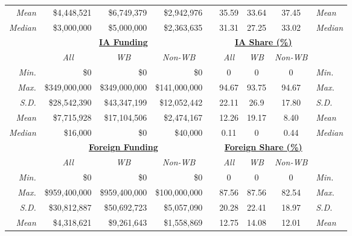 \documentclass{article}
\begin{document}
\begin{singlespace}
\begin{table}[H]
{\begin{tabular}{rrrrlcccl}
			\textit{Mean} & \$4,448,521 & \$6,749,379 & \$2,942,976 &  & 35.59 & 33.64 & 37.45 & \textit{Mean} \\
			\textit{Median} & \$3,000,000 & \$5,000,000 & \$2,363,635 &  & 31.31 & 27.25 & 33.02 & \textit{Median} \\ \hline
			\multicolumn{1}{c}{{\ul \textit{\textbf{}}}} & \multicolumn{3}{c}{{\ul \textbf{IA Funding}}} & \multicolumn{1}{c}{{\ul \textbf{}}} & \multicolumn{3}{c}{{\ul \textbf{IA Share (\%)}}} & \multicolumn{1}{c}{{\ul \textit{\textbf{}}}} \\
			\multicolumn{1}{c}{} & \multicolumn{1}{c}{\textit{All}} & \multicolumn{1}{c}{\textit{WB}} & \multicolumn{1}{c}{\textit{Non-WB}} & \multicolumn{1}{c}{\textit{}} & \textit{All} & \textit{WB} & \textit{Non-WB} & \multicolumn{1}{c}{} \\
			\textit{Min.} & \$0 & \$0 & \$0 &  & 0 & 0 & 0 & \textit{Min.} \\
			\textit{Max.} & \$349,000,000 & \$349,000,000 & \$141,000,000 &  & 94.67 & 93.75 & 94.67 & \textit{Max.} \\
			\textit{S.D.} & \$28,542,390 & \$43,347,199 & \$12,052,442 &  & 22.11 & 26.9 & 17.80 & \textit{S.D.} \\
			\textit{Mean} & \$7,715,928 & \$17,104,506 & \$2,474,167 &  & 12.26 & 19.17 & 8.40 & \textit{Mean} \\
			\textit{Median} & \$16,000 & \$0 & \$40,000 &  & 0.11 & 0 & 0.44 & \textit{Median} \\ \hline
			\multicolumn{1}{c}{{\ul \textit{\textbf{}}}} & \multicolumn{3}{c}{{\ul \textbf{Foreign Funding}}} & \multicolumn{1}{c}{{\ul \textbf{}}} & \multicolumn{3}{c}{{\ul \textbf{Foreign Share (\%)}}} & \multicolumn{1}{c}{{\ul \textit{\textbf{}}}} \\
			\multicolumn{1}{c}{} & \multicolumn{1}{c}{\textit{All}} & \multicolumn{1}{c}{\textit{WB}} & \multicolumn{1}{c}{\textit{Non-WB}} & \multicolumn{1}{c}{\textit{}} & \textit{All} & \textit{WB} & \textit{Non-WB} & \multicolumn{1}{c}{} \\
			\textit{Min.} & \$0 & \$0 & \$0 &  & 0 & 0 & 0 & \textit{Min.} \\
			\textit{Max.} & \$959,400,000 & \$959,400,000 & \$100,000,000 &  & 87.56 & 87.56 & 82.54 & \textit{Max.} \\
			\textit{S.D.} & \$30,812,887 & \$50,692,723 & \$5,057,090 &  & 20.28 & 22.41 & 18.97 & \textit{S.D.} \\
			\textit{Mean} & \$4,318,621 & \$9,261,643 & \$1,558,869 &  & 12.75 & 14.08 & 12.01 & \textit{Mean} \\

\end{tabular}}
\end{table}
\end{singlespace}
\end{document}
